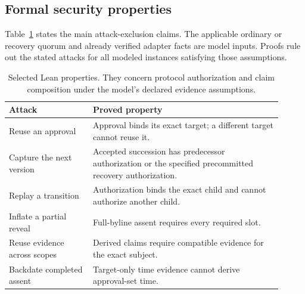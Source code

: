 \documentclass[conference,compsoc]{IEEEtran}
\begin{document}
\subsection{Formal security properties}
\label{sec:formal}

Table~\ref{tab:formal-properties} states the main attack-exclusion claims.
The applicable ordinary or recovery quorum and already verified adapter facts
are model inputs. Proofs rule out the stated attacks for all modeled instances
satisfying those assumptions.

\begin{table}[t]
\centering\small
\begin{tabular}{p{0.28\linewidth}p{0.63\linewidth}}
\toprule
Attack & Proved property \\
\midrule
Reuse an approval & Approval binds its exact target; a different target cannot reuse it. \\
Capture the next version & Accepted succession has predecessor authorization or the specified precommitted recovery authorization. \\
Replay a transition & Authorization binds the exact child and cannot authorize another child. \\
Inflate a partial reveal & Full-byline assent requires every required slot. \\
Reuse evidence across scopes & Derived claims require compatible evidence for the exact subject. \\
Backdate completed assent & Target-only time evidence cannot derive approval-set time. \\
\bottomrule
\end{tabular}
\caption{Selected Lean properties. They concern protocol authorization and
claim composition under the model's declared evidence assumptions.}
\label{tab:formal-properties}
\end{table}
\end{document}
